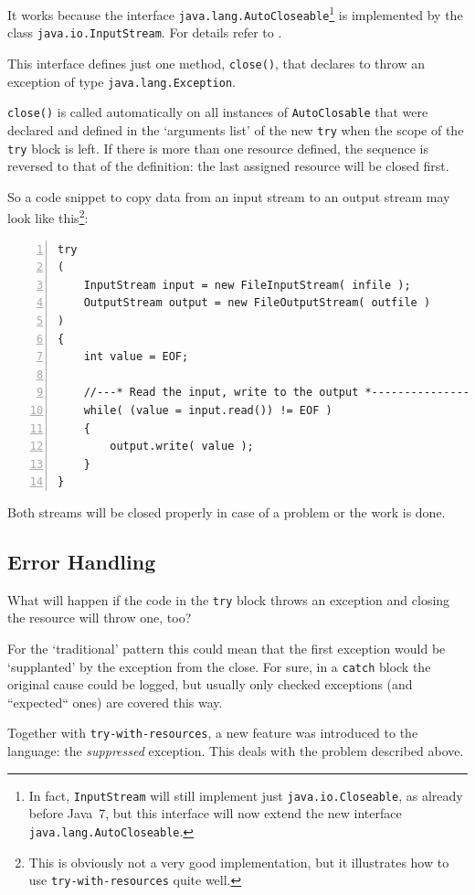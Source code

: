 \documentclass[11pt,a4paper, titlepage, parskip=half, headsepline, footsepline, cleardoublepage=current, headheight=1cm]{scrbook}
\begin{document}
It works because the interface \lstinline|java.lang.AutoCloseable|\footnote{In fact, \lstinline|InputStream| will still implement just \lstinline|java.io.Closeable|, as already before Java~7, but this interface will now extend the new interface \lstinline|java.lang.AutoCloseable|.} is implemented by the class \lstinline|java.io.InputStream|. For details refer to \autocite{ORACLE_DOC_AUTOCLOSEABLE_INTERFACE}.

This interface defines just one method, \lstinline|close()|, that declares to throw an exception of type \lstinline|java.lang.Exception|.

\lstinline|close()| is called automatically on all instances of \lstinline|AutoClosable| that were declared and defined in the ‘arguments list’ of the new \lstinline|try| when the scope of the \lstinline|try| block is left. If there is more than one resource defined, the sequence is reversed to that of the definition: the last assigned resource will be closed first.

So a code snippet to copy data from an input stream to an output stream may look like this\footnote{This is obviously not a very good implementation, but it illustrates how to use \lstinline|try-with-resources| quite well.}:
\begin{lstlisting}[numbers=left]
try
( 
    InputStream input = new FileInputStream( infile );
    OutputStream output = new FileOutputStream( outfile ) 
)
{
	int value = EOF;
	
    //---* Read the input, write to the output *---------------------
    while( (value = input.read()) != EOF )
    {
        output.write( value );
    }
}
\end{lstlisting}
Both streams will be closed properly in case of a problem or the work is done.

\subsection{Error Handling}
What will happen if the code in the \lstinline|try| block throws an exception and closing the resource will throw one, too?

For the ‘traditional’ pattern this could mean that the first exception would be ‘supplanted’ by the exception from the close. For sure, in a \lstinline|catch| block the original cause could be logged, but usually only checked exceptions (and “expected“ ones) are covered this way.

Together with \lstinline|try-with-resources|, a new feature was introduced to the language: the \textit{suppressed} exception. This deals with the problem described above.
\end{document}
